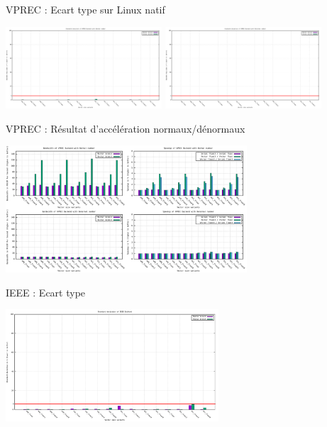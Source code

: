 \documentclass{beamer}
\begin{document}
\begin{frame}{VPREC : Ecart type sur Linux natif}


 \centering\includegraphics[width=220px]{../ressources/laptop_vprec_normal_stddev.png}
 \centering\includegraphics[width=220px]{../ressources/laptop_vprec_denormal_stddev.png}
    
\end{frame}



\begin{frame}{VPREC : Résultat d'accélération normaux/dénormaux}

 \centering\includegraphics[width=340px]{../ressources/vm_vprec.png}
   
\end{frame}

\begin{frame}{IEEE : Ecart type}
   

 \centering\includegraphics[width=300px]{../ressources/vm_ieee_stddev.png}
    

\end{frame}
\end{document}
